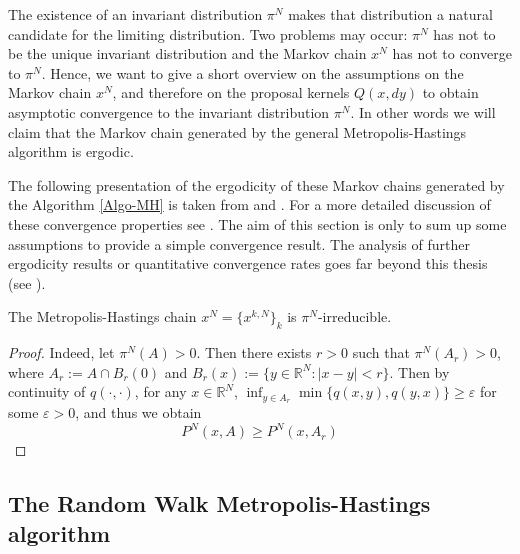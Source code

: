 The existence of an invariant distribution $ \pi^{N} $ makes that distribution a natural candidate for the limiting distribution. Two problems may occur: $ \pi^{N} $ has not to be the unique invariant distribution and the Markov chain $ x^{N} $ has not to converge to $ \pi^{N} $. Hence, we want to give a short overview on the assumptions on the Markov chain $ x^{N} $, and therefore on the proposal kernels $ Q(x,dy) $ to obtain asymptotic convergence to the invariant distribution $ \pi^{N} $. In other words we will claim that the Markov chain generated by the general Metropolis-Hastings algorithm is ergodic. 

The following presentation of the ergodicity of these Markov chains generated by the Algorithm \ref{Algo-MH} is taken from \autocite{Robert2005} and \autocite{Rosenthal2004}. For a more detailed discussion of these convergence properties see \autocite{Meyn2009, Robert2005, Rosenthal2004}. The aim of this section is only to sum up some assumptions to provide a simple convergence result. The analysis of further ergodicity results or quantitative convergence rates goes far beyond this thesis (see \autocite{Meyn2009}).






\begin{claim}
 The Metropolis-Hastings chain $ x^{N} = \{ x^{k,N} \}_{k} $ is $ \pi^{N} $-irreducible.
\end{claim}

\begin{proof}
 Indeed, let $ \pi^{N}(A) > 0 $. Then there exists $ r > 0 $ such that $ \pi^{N}(A_r) > 0 $, where $ A_r := A \cap B_r(0) $ and $ B_r(x) := \{ y \in \mathbb{R}^{N} : |x-y| < r \}  $. Then by continuity of $q(\cdot,\cdot)$, for any $ x \in \mathbb{R}^{N} $, $ \inf_{y \in A_r} \min \{ q(x,y), q(y,x) \} \geq \varepsilon $ for some $ \varepsilon > 0 $, and thus we obtain
 \begin{equation}
  P^{N}(x,A) \geq P^{N}(x, A_r)
 \end{equation}

\end{proof}






\subsection{The Random Walk Metropolis-Hastings algorithm}
\label{MH-RWM}

